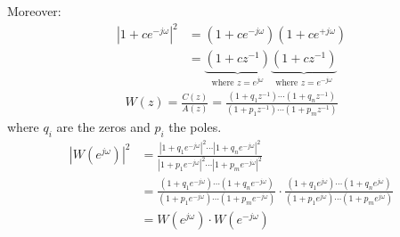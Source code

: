 Moreover:
\begin{align*}
	|1+c e^{-j \omega}|^2&=\left(1+c e^{-j \omega}\right)\left(1+c e^{+j \omega}\right)\\
	&=\underbrace{\left(1+c z^{-1}\right)}_\text{where $z=e^{j \omega}$}\underbrace{\left(1+c z^{-1}\right)}_\text{where $z=e^{-j \omega}$}
\end{align*}
\begin{align*}
	W(z)=\frac{C(z)}{A(z)}=\frac{(1+q_1z^{-1})\cdots(1+q_nz^{-1})}{(1+p_1z^{-1})\cdots(1+p_mz^{-1})}
\end{align*}
where $q_i$ are the zeros and $p_i$ the poles.
\begin{align*}
	\left|W\left(e^{j \omega}\right)\right|^{2}&=\frac{|1+q_1e^{-j \omega}|^2\cdots|1+q_ne^{-j \omega}|^2}{|1+p_1e^{-j \omega}|^2\cdots|1+p_me^{-j \omega}|^2}\\
	&=\frac{(1+q_1e^{-j \omega})\cdots(1+q_ne^{-j \omega})}{(1+p_1e^{-j \omega})\cdots(1+p_me^{-j \omega})}\cdot\frac{(1+q_1e^{j \omega})\cdots(1+q_ne^{j \omega})}{(1+p_1e^{j \omega})\cdots(1+p_me^{j \omega})}\\
			&=W\left(e^{j \omega}\right)\cdot W\left(e^{-j \omega}\right)
\end{align*}